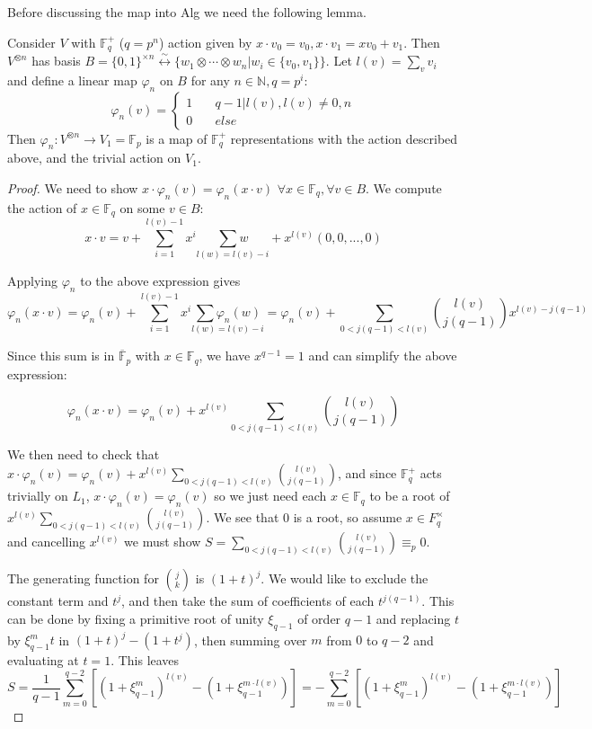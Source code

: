 \documentclass[11pt]{article} %
\begin{document}
Before discussing the map into Alg we need the following lemma.

\begin{lemma} Consider $V$ with $\mathbb{F}_q^{+}$ ($q=p^n$) action given by $x\cdot v_0 = v_0,x \cdot v_1 = xv_0 + v_1$. Then $V^{\otimes{n}}$ has basis $B =\{0,1\}^{\times n}\overset{\sim}{\longleftrightarrow} \{w_1 \otimes \cdots \otimes w_n | w_i \in \{v_0,v_1\}\}$. Let $l(v) = \sum_v{v_i}$ and define a linear map $\varphi_n$ on $B$ for any $n \in \mathbb{N}, q = p^i$:
$$
\varphi_n(v) = \left\{
        \begin{array}{ll}
            1 & \quad q-1| l(v), l(v) \neq 0,n \\
            0 & \quad else
        \end{array}
    \right.
$$
\noindent Then $ \varphi_n: V^{\otimes n} \rightarrow V_1=\mathbb{F}_p$ is a map of $\mathbb{F}_q^{+}$ representations with the action described above, and the trivial action on $V_1$.
\begin{proof}
We need to show $x \cdot \varphi_n(v) = \varphi_n(x \cdot v)$ $\forall x \in \mathbb{F}_q, \forall v \in B$. We compute the action of $x \in \mathbb{F}_q$ on some $v \in B$:
$$
x \cdot v = v +  \underset{i=1}{\sum^{l(v) - 1}}{x^i}\underset{l(w) = l(v)-i}{\sum{w}} + x^{l(v)}(0,0,...,0)
$$

\noindent Applying $\varphi_n$ to the above expression gives
$$
\varphi_n(x\cdot v) = \varphi_n(v) + \underset{i=1}{\sum^{l(v) - 1}}{x^i}\underset{l(w) = l(v)-i}{\sum{\varphi_n(w)}}
= \varphi_n(v) + \sum_{0 < j(q-1) < l(v)}{{l(v)}\choose{j(q-1)}}x^{l(v)-j(q-1)}
$$

\noindent Since this sum is in $\overline{\mathbb{F}}_p$ with $x \in \mathbb{F}_q$, we have $x^{q-1} = 1$ and can simplify the above expression:

$$
\varphi_n(x\cdot v) = \varphi_n(v) + x^{l(v)}\sum_{0 < j(q-1) < l(v)}{{l(v)}\choose{j(q-1)}}
$$

We then need to check that $x \cdot \varphi_n(v) = \varphi_n(v) + x^{l(v)}\sum_{0 < j(q-1) < l(v)}{{l(v)}\choose{j(q-1)}}$, and since $\mathbb{F}_q^+$ acts trivially on $L_1$, $x\cdot \varphi_n(v) = \varphi_n(v)$ so we just need each $x \in \mathbb{F}_q$ to be a root of $x^{l(v)}\sum_{0 < j(q-1) < l(v)}{{l(v)}\choose{j(q-1)}}$. We see that $0$ is a root, so assume $x \in F_q^{\times}$ and cancelling $x^{l(v)}$ we must show $S = \sum_{0 < j(q-1) < l(v)}{{l(v)}\choose{j(q-1)}} \equiv_p 0$.

The generating function for ${j}\choose{k}$ is $(1 + t)^j$. We would like to exclude the constant term and $t^j$, and then take the sum of coefficients of each $t^{j(q-1)}$. This can be done by fixing a primitive root of unity $\xi_{q-1}$ of order $q-1$ and replacing $t$ by $\xi_{q-1}^mt$ in $(1+t)^j-(1+t^j)$, then summing over $m$ from $0$ to $q-2$ and evaluating at $t=1$. This leaves
$$
S = \frac{1}{q-1} \sum_{m=0}^{q-2}[(1 + \xi_{q-1}^m)^{l(v)}-(1 +  \xi_{q-1}^{m\cdot l(v)})] =  - \sum_{m=0}^{q-2}[(1 + \xi_{q-1}^m)^{l(v)}-(1 +  \xi_{q-1}^{m\cdot l(v)})]
$$


\end{proof}
\end{lemma}
\end{document}
